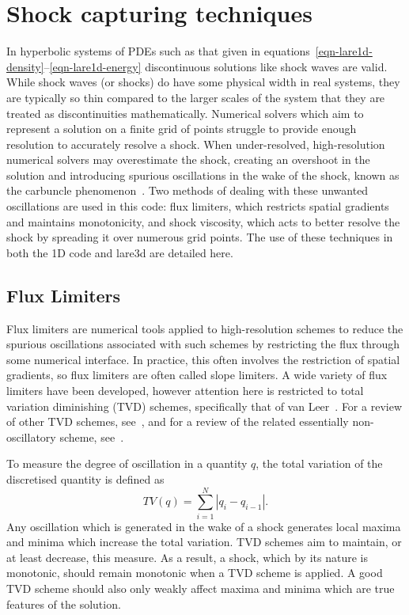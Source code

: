 
\section{Shock capturing techniques}
\label{sec:shock_capturing}

In hyperbolic systems of PDEs such as that given in equations~\ref{eqn-lare1d-density}--\ref{eqn-lare1d-energy} discontinuous solutions like shock waves are valid. While shock waves (or shocks) do have some physical width in real systems, they are typically so thin compared to the larger scales of the system that they are treated as discontinuities mathematically. Numerical solvers which aim to represent a solution on a finite grid of points struggle to provide enough resolution to accurately resolve a shock. When under-resolved, high-resolution numerical solvers may overestimate the shock, creating an overshoot in the solution and introducing spurious oscillations in the wake of the shock, known as the carbuncle phenomenon~\cite{rodionovArtificialViscosityCure2019}. Two methods of dealing with these unwanted oscillations are used in this code: flux limiters, which restricts spatial gradients and maintains monotonicity, and shock viscosity, which acts to better resolve the shock by spreading it over numerous grid points. The use of these techniques in both the 1D code and lare3d are detailed here.

\subsection{Flux Limiters}
\label{sec-flux-limiters}

Flux limiters are numerical tools applied to high-resolution schemes to reduce the spurious oscillations associated with such schemes by restricting the flux through some numerical interface. In practice, this often involves the restriction of spatial gradients, so flux limiters are often called slope limiters. A wide variety of flux limiters have been developed, however attention here is restricted to total variation diminishing (TVD) schemes, specifically that of van Leer~\cite{vanleerUltimateConservativeDifference1997}. For a review of other TVD schemes, see~\cite{zhangReviewTVDSchemes2015}, and for a review of the related essentially non-oscillatory scheme, see~\cite{shuHighOrderENO1999a}. 

To measure the degree of oscillation in a quantity $q$, the total variation of the discretised quantity is defined as
\begin{equation}
  \label{eq:total_variation}
TV(q) = \sum_{i=1}^{N} | q_i - q_{i-1} |.
\end{equation}
Any oscillation which is generated in the wake of a shock generates local maxima and minima which increase the total variation. TVD schemes aim to maintain, or at least decrease, this measure. As a result, a shock, which by its nature is monotonic, should remain monotonic when a TVD scheme is applied. A good TVD scheme should also only weakly affect maxima and minima which are true features of the solution.

